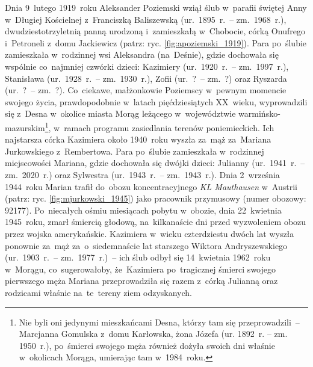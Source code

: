 Dnia 9~lutego 1919~roku Aleksander
Poziemski wziął ślub
w~parafii świętej Anny w~Długiej Kościelnej z~Franciszką
Baliszewską
(ur.~1895~r.~-- zm.~1968~r.), dwudziestotrzyletnią panną urodzoną
i~zamieszkałą w~Chobocie, córką Onufrego i~Petroneli z~domu Jackiewicz
(patrz: ryc. \ref{fig:apoziemski_1919}). Para po~ślubie zamieszkała
w~rodzinnej wsi Aleksandra (na~Deśnie), gdzie dochowała się wspólnie
co~najmniej czwórki dzieci:
Kazimiery
(ur.~1920~r.~-- zm.~1997~r.), Stanisława
(ur.~1928~r.~-- zm.~1930~r.), Zofii
(ur.~?~-- zm.~?) oraz Ryszarda
(ur.~?~-- zm.~?). Co~ciekawe, małżonkowie Poziemscy w~pewnym momencie swojego
życia, prawdopodobnie w~latach pięćdziesiątych XX~wieku, wyprowadzili się
z~Desna w~okolice miasta Morąg leżącego w~województwie
warmińsko-mazurskim\footnote{Nie byli oni jedynymi mieszkańcami Desna, którzy
tam się przeprowadzili~-- Marcjanna
Gomulska
z~domu Karłowska, żona Józefa
(ur. 1892~r. -- zm. 1950~r.), po~śmierci swojego męża również dożyła swoich
dni właśnie w~okolicach Morąga, umierając tam w~1984~roku.}, w~ramach programu
zasiedlania terenów poniemieckich. Ich najstarsza córka
Kazimiera
około 1940~roku wyszła za~mąż za~Mariana
Jurkowskiego z~Rembertowa.
Para po~ślubie zamieszkała w~rodzinnej miejscowości Mariana, gdzie dochowała
się dwójki dzieci:
Julianny (ur.~1941~r.~--
zm.~2020~r.) oraz
Sylwestra (ur.~1943~r.~--
zm.~1943~r.). Dnia 2~września 1944~roku Marian trafił do~obozu
koncentracyjnego \emph{KL Mauthausen} w~Austrii (patrz: ryc.
\ref{fig:mjurkowski_1945}) jako pracownik przymusowy (numer obozowy: 92177).
Po~niecałych ośmiu miesiącach pobytu w~obozie, dnia 22~kwietnia 1945~roku,
zmarł śmiercią głodową, na~kilkanaście dni przed wyzwoleniem obozu przez
wojska amerykańskie.
Kazimiera
w~wieku czterdziestu dwóch lat wyszła ponownie za~mąż za~o~siedemnaście lat
starszego Wiktora
Andryszewskiego
(ur.~1903~r.~-- zm.~1977~r.)~-- ich ślub odbył się 14~kwietnia 1962~roku
w~Morągu, co~sugerowałoby, że~Kazimiera po~tragicznej śmierci swojego
pierwszego męża Mariana przeprowadziła się razem z~córką Julianną oraz
rodzicami właśnie na~te~tereny ziem odzyskanych.

